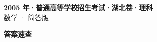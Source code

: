 \documentclass[zihao=-4, a4paper]{ctexart}
\begin{document}
\begin{center}
  {\Large\bfseries 2005 年·普通高等学校招生考试·湖北卷·理科}\\[4pt]
  {\large 数学 · 简答版}
\end{center}
\medskip
{}

\clearpage
{}
\begin{center}{\Large\bfseries 答案速查}\end{center}
\medskip

\end{document}
